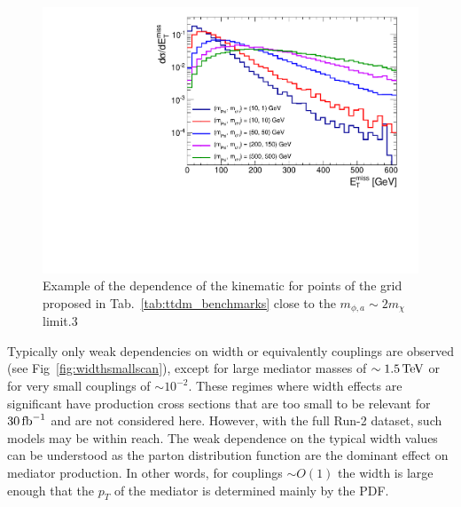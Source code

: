 \begin{figure}[!ht]
  \begin{center}
    \includegraphics[scale=0.45]{figures/ttbar/MEt_diagonal_scan.pdf}
    \vspace{2mm}
    \caption{\label{fig:scanPhidiag} Example of the dependence of the kinematic for points of the grid proposed in Tab.~\ref{tab:ttdm_benchmarks} close to the $m_{\phi,a} \sim 2m_\chi$ limit.3
    }
\end{center}
\end{figure}

Typically only weak dependencies on width or equivalently couplings are observed (see Fig~\ref{fig:widthsmallscan}), except for large mediator masses of $\sim 1.5\,{\rm TeV}$ or for very small couplings of $\sim 10^{-2}$. These regimes where width effects are significant have production cross sections that are too small to be relevant for $30\,{\rm fb}^{-1}$ and are not considered here. However, with the full Run-2 dataset, such models may be within reach. The weak dependence on the typical width values can be understood as the parton distribution function are the dominant effect on mediator production. In other words, for couplings $\sim O(1)$ the width is large enough that the $p_T$ of the mediator is determined mainly by the PDF.

